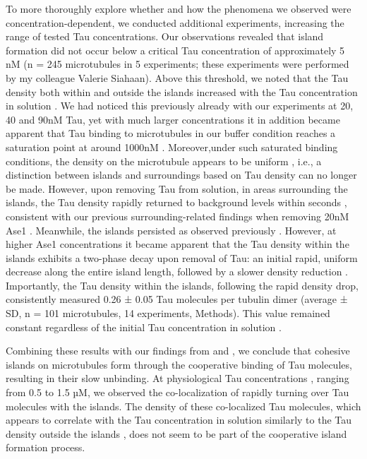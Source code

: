 To more thoroughly explore whether and how the phenomena we observed were concentration-dependent, we conducted additional experiments, increasing the range of tested Tau concentrations. Our observations revealed that island formation did not occur below a critical Tau concentration of approximately 5 nM (n = 245 microtubules in 5 experiments; these experiments were performed by my colleague Valerie Siahaan). Above this threshold, we noted that the Tau density both within and outside the islands increased with the Tau concentration in solution . We had noticed this previously already with our experiments at 20, 40 and 90nM Tau, yet with much larger concentrations it in addition became apparent that Tau binding to microtubules in our buffer condition reaches a saturation point at around 1000nM . Moreover,under such saturated binding conditions, the density on the microtubule appears to be uniform , i.e., a distinction between islands and surroundings based on Tau density can no longer be made. However, upon removing Tau from solution, in areas surrounding the islands, the Tau density rapidly returned to background levels within seconds , consistent with our previous surrounding-related findings when removing 20nM Ase1 . Meanwhile, the islands persisted  as observed previously . However, at higher Ase1 concentrations it became apparent that the Tau density within the islands exhibits a two-phase decay upon removal of Tau: an initial rapid, uniform decrease along the entire island length, followed by a slower density reduction . Importantly, the Tau density within the islands, following the rapid density drop, consistently measured 0.26 ± 0.05 Tau molecules per tubulin dimer (average ± SD, n = 101 microtubules, 14 experiments, Methods). This value remained constant regardless of the initial Tau concentration in solution . \par

Combining these results with our findings from  and , we conclude that cohesive islands on microtubules form through the cooperative binding of Tau molecules, resulting in their slow unbinding. At physiological Tau concentrations \parencite{Wegmann}, ranging from 0.5 to 1.5 µM, we observed the co-localization of rapidly turning over Tau molecules with the islands. The density of these co-localized Tau molecules, which appears to correlate with the Tau concentration in solution similarly to the Tau density outside the islands , does not seem to be part of the cooperative island formation process. \par

